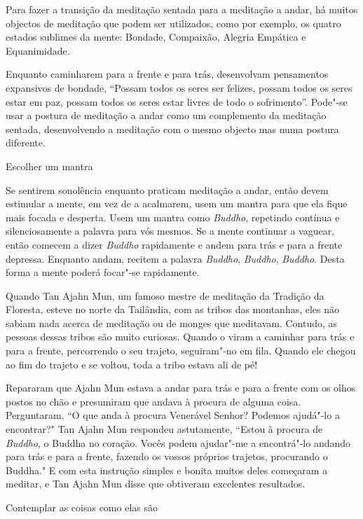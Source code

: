 Para fazer a transição da meditação sentada para a meditação a andar, há
muitos objectos de meditação que podem ser utilizados, como por exemplo,
os quatro estados sublimes da mente: Bondade, Compaixão, Alegria
Empática e Equanimidade.

Enquanto caminharem para a frente e para trás, desenvolvam pensamentos
expansivos de bondade, ``Possam todos os seres ser felizes, possam todos
os seres estar em paz, possam todos os seres estar livres de todo o
sofrimento''. Pode"-se usar a postura de meditação a andar como um
complemento da meditação sentada, desenvolvendo a meditação com o mesmo
objecto mas numa postura diferente.

\begin{siderule-quote}
  Escolher um mantra
\end{siderule-quote}

Se sentirem sonolência enquanto praticam meditação a andar, então devem
estimular a mente, em vez de a acalmarem, usem um mantra para que ela
fique mais focada e desperta. Usem um mantra como \emph{Buddho},
repetindo contínua e silenciosamente a palavra para vós mesmos. Se a
mente continuar a vaguear, então comecem a dizer \emph{Buddho}
rapidamente e andem para trás e para a frente depressa. Enquanto andam,
recitem a palavra \emph{Buddho}, \emph{Buddho}, \emph{Buddho}. Desta
forma a mente poderá focar"-se rapidamente.

Quando Tan Ajahn Mun, um famoso mestre de meditação da Tradição
da Floresta, esteve no norte da Tailândia, com as tribos das montanhas,
eles não sabiam nada acerca de meditação ou de monges que meditavam.
Contudo, as pessoas dessas tribos são muito curiosas. Quando o viram a
caminhar para trás e para a frente, percorrendo o seu trajeto,
seguiram"-no em fila. Quando ele chegou ao fim do trajeto e se voltou,
toda a tribo estava ali de pé!

Repararam que Ajahn Mun estava a andar para trás e para a frente
com os olhos postos no chão e presumiram que andava à procura de alguma
coisa. Perguntaram, ``O que anda à procura Venerável Senhor? Podemos
ajudá"-lo a encontrar?" Tan Ajahn Mun respondeu astutamente,
``Estou à procura de \emph{Buddho}, o Buddha no coração. Vocês
podem ajudar"-me a encontrá"-lo andando para trás e para a frente, fazendo
os vossos próprios trajetos, procurando o Buddha." E com esta
instrução simples e bonita muitos deles começaram a meditar, e Tan
Ajahn Mun disse que obtiveram excelentes resultados.

\begin{siderule-quote}
  Contemplar as coisas como elas são
\end{siderule-quote}

